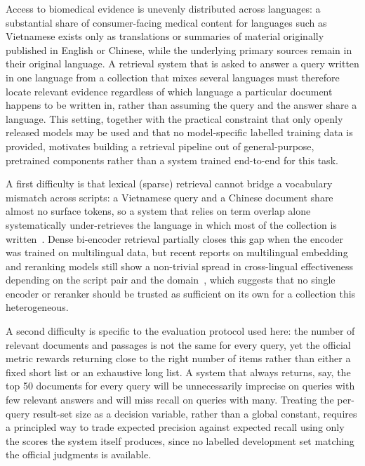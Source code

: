 \documentclass[runningheads]{llncs}
\begin{document}
Access to biomedical evidence is unevenly distributed across languages: a
substantial share of consumer-facing medical content for languages such as
Vietnamese exists only as translations or summaries of material originally
published in English or Chinese, while the underlying primary sources remain
in their original language. A retrieval system that is asked to answer a
query written in one language from a collection that mixes several languages
must therefore locate relevant evidence regardless of which language a
particular document happens to be written in, rather than assuming the query
and the answer share a language. This setting, together with the practical
constraint that only openly released models may be used and that no
model-specific labelled training data is provided, motivates building a
retrieval pipeline out of general-purpose, pretrained components rather than
a system trained end-to-end for this task.

A first difficulty is that lexical (sparse) retrieval cannot bridge a
vocabulary mismatch across scripts: a Vietnamese query and a Chinese document
share almost no surface tokens, so a system that relies on term overlap alone
systematically under-retrieves the language in which most of the collection is
written~\cite{lipton2014thresholding}. Dense bi-encoder retrieval partially
closes this gap when the encoder was trained on multilingual data, but recent
reports on multilingual embedding and reranking models still show a
non-trivial spread in cross-lingual effectiveness depending on the script
pair and the domain~\cite{qwen3embedding2025}, which suggests that no single
encoder or reranker should be trusted as sufficient on its own for a
collection this heterogeneous.

A second difficulty is specific to the evaluation protocol used here: the
number of relevant documents and passages is not the same for every query, yet
the official metric rewards returning close to the right number of items
rather than either a fixed short list or an exhaustive long list. A system
that always returns, say, the top 50 documents for every query will be
unnecessarily imprecise on queries with few relevant answers and will miss
recall on queries with many. Treating the per-query result-set size as a
decision variable, rather than a global constant, requires a principled way
to trade expected precision against expected recall using only the scores the
system itself produces, since no labelled development set matching the
official judgments is available.
\end{document}
